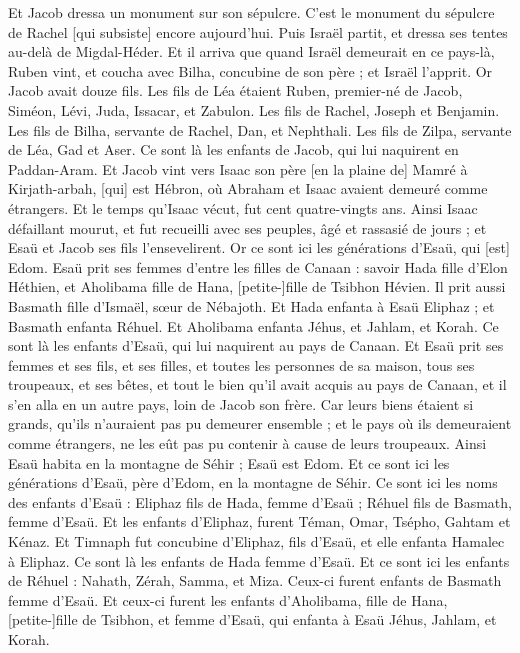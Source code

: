 \begin{multicols}{2}
Et Jacob dressa un monument sur son sépulcre. C'est le monument du sépulcre de Rachel [qui subsiste] encore aujourd'hui.
Puis Israël partit, et dressa ses tentes au-delà de Migdal-Héder.
Et il arriva que quand Israël demeurait en ce pays-là, Ruben vint, et coucha avec Bilha, concubine de son père ; et Israël l'apprit. Or Jacob avait douze fils.
Les fils de Léa étaient Ruben, premier-né de Jacob, Siméon, Lévi, Juda, Issacar, et Zabulon.
Les fils de Rachel, Joseph et Benjamin.
Les fils de Bilha, servante de Rachel, Dan, et Nephthali.
Les fils de Zilpa, servante de Léa, Gad et Aser. Ce sont là les enfants de Jacob, qui lui naquirent en Paddan-Aram.
Et Jacob vint vers Isaac son père [en la plaine de] Mamré à Kirjath-arbah, [qui] est Hébron, où Abraham et Isaac avaient demeuré comme étrangers.
Et le temps qu'Isaac vécut, fut cent quatre-vingts ans.
Ainsi Isaac défaillant mourut, et fut recueilli avec ses peuples, âgé et rassasié de jours ; et Esaü et Jacob ses fils l'ensevelirent.
\VerseOne{}Or ce sont ici les générations d'Esaü, qui [est] Edom.
Esaü prit ses femmes d'entre les filles de Canaan : savoir Hada fille d'Elon Héthien, et Aholibama fille de Hana, [petite-]fille de Tsibhon Hévien.
Il prit aussi Basmath fille d'Ismaël, sœur de Nébajoth.
Et Hada enfanta à Esaü Eliphaz ; et Basmath enfanta Réhuel.
Et Aholibama enfanta Jéhus, et Jahlam, et Korah. Ce sont là les enfants d'Esaü, qui lui naquirent au pays de Canaan.
Et Esaü prit ses femmes et ses fils, et ses filles, et toutes les personnes de sa maison, tous ses troupeaux, et ses bêtes, et tout le bien qu'il avait acquis au pays de Canaan, et il s'en alla en un autre pays, loin de Jacob son frère.
Car leurs biens étaient si grands, qu'ils n'auraient pas pu demeurer ensemble ; et le pays où ils demeuraient comme étrangers, ne les eût pas pu contenir à cause de leurs troupeaux.
Ainsi Esaü habita en la montagne de Séhir ; Esaü est Edom.
Et ce sont ici les générations d'Esaü, père d'Edom, en la montagne de Séhir.
Ce sont ici les noms des enfants d'Esaü : Eliphaz fils de Hada, femme d'Esaü ; Réhuel fils de Basmath, femme d'Esaü.
Et les enfants d'Eliphaz, furent Téman, Omar, Tsépho, Gahtam et Kénaz.
Et Timnaph fut concubine d'Eliphaz, fils d'Esaü, et elle enfanta Hamalec à Eliphaz. Ce sont là les enfants de Hada femme d'Esaü.
Et ce sont ici les enfants de Réhuel : Nahath, Zérah, Samma, et Miza. Ceux-ci furent enfants de Basmath femme d'Esaü.
Et ceux-ci furent les enfants d'Aholibama, fille de Hana, [petite-]fille de Tsibhon, et femme d'Esaü, qui enfanta à Esaü Jéhus, Jahlam, et Korah.

\end{multicols}
